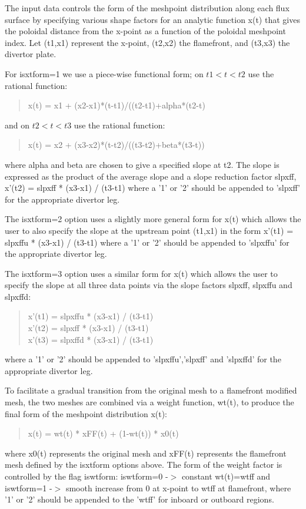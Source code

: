 \documentclass [12pt]{article}
\begin{document}
The input data controls the form of the meshpoint distribution along
each flux surface by specifying various shape factors for an analytic
function x(t) that gives the poloidal distance from the x-point as a
function of the poloidal meshpoint index. Let (t1,x1) represent the
x-point, (t2,x2) the flamefront, and (t3,x3) the divertor plate.

For isxtform=1 we use a piece-wise functional form; on $t1 < t < t2$ use
the rational function:
\begin{verse} \sf
            x(t) = x1 + (x2-x1)*(t-t1)/((t2-t1)+alpha*(t2-t)
\end{verse}
and on $t2 < t < t3$ use the rational function:
\begin{verse} \sf
            x(t) = x2 + (x3-x2)*(t-t2)/((t3-t2)+beta*(t3-t))
\end{verse}
where alpha and beta are chosen to give a specified slope at t2.  The
slope is expressed as the product of the average slope and a slope
reduction factor slpxff, x'(t2) = slpxff * (x3-x1) / (t3-t1)
where a '1' or '2' should be appended to 'slpxff' for the appropriate
divertor leg.

The isxtform=2 option uses a slightly more general form for x(t) which
allows the user to also specify the slope at the upstream point
(t1,x1) in the form x'(t1) = slpxffu * (x3-x1) / (t3-t1) where a '1'
or '2' should be appended to 'slpxffu' for the appropriate divertor
leg.

The isxtform=3 option uses a similar form for x(t) which
allows the user to specify the slope at all three data points via the
slope factors slpxff, slpxffu and slpxffd:
\begin{verse} \sf
      x'(t1) = slpxffu * (x3-x1) / (t3-t1) \\
      x'(t2) = slpxff  * (x3-x1) / (t3-t1) \\
      x'(t3) = slpxffd * (x3-x1) / (t3-t1) \\
\end{verse}
where a '1' or '2' should be appended to 'slpxffu','slpxff' and
'slpxffd' for the appropriate divertor leg.

To facilitate a gradual transition from the original mesh to a
flamefront modified mesh, the two meshes are combined via a weight
function, wt(t), to produce the final form of the meshpoint
distribution x(t):
\begin{verse} \sf
      x(t) = wt(t) * xFF(t) + (1-wt(t)) * x0(t)
\end{verse}
where x0(t) represents the original mesh and xFF(t) represents the
flamefront mesh defined by the isxtform options above.  The form of
the weight factor is controlled by the flag iswtform: iswtform=0 -$>$
constant wt(t)=wtff and iswtform=1 -$>$ smooth increase from 0 at
x-point to wtff at flamefront, where '1' or '2' should be appended to
the 'wtff' for inboard or outboard regions.
\end{document}
